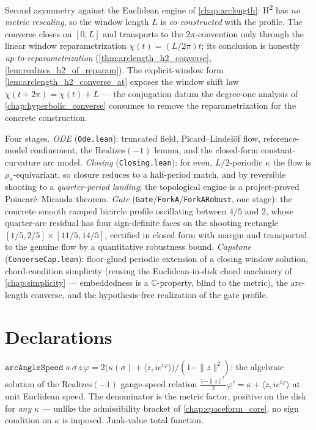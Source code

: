Second asymmetry against the Euclidean engine of \cref{chap:arclength}:
H\textsuperscript{2} has \emph{no metric rescaling}, so the window length $L$
is \emph{co-constructed} with the profile. The converse closes on $[0,L]$ and
transports to the $2\pi$-convention only through the linear window
reparametrization $\chi(t)=(L/2\pi)t$; its conclusion is honestly
\emph{up-to-reparametrization} (\cref{thm:arclength_h2_converse},
\cref{lem:realizes_h2_of_reparam}). The explicit-window form
\cref{lem:arclength_h2_converse_at} exposes the window shift law
$\chi(t+2\pi)=\chi(t)+L$ — the conjugation datum the degree-one analysis of
\cref{chap:hyperbolic_converse} consumes to remove the reparametrization for
the concrete construction.

Four stages. \emph{ODE} (\texttt{Ode.lean}): truncated field, Picard--Lindelöf
flow, reference-model confinement, the $\mathrm{Realizes}(-1)$ lemma, and the
closed-form constant-curvature arc model. \emph{Closing}
(\texttt{Closing.lean}): for even, $L/2$-periodic $\kappa$ the flow is
$\rho_\pi$-equivariant, so closure reduces to a half-period match, and by
reversible shooting to a \emph{quarter-period landing}; the topological engine
is a project-proved Poincaré--Miranda theorem. \emph{Gate}
(\texttt{Gate}/\texttt{ForkA}/\texttt{ForkARobust}, one stage): the concrete
smooth ramped bicircle profile oscillating between $4/5$ and $2$, whose
quarter-arc residual has four sign-definite faces on the shooting rectangle
$[1/5,2/5]\times[11/5,14/5]$, certified in closed form with margin and
transported to the genuine flow by a quantitative robustness bound.
\emph{Capstone} (\texttt{ConverseCap.lean}): floor-glued periodic extension of
a closing window solution, chord-condition simplicity (reusing the
Euclidean-in-disk chord machinery of \cref{chap:simplicity} — embeddedness is a
$\mathbb C$-property, blind to the metric), the arc-length converse, and the
hypothesis-free realization of the gate profile.

\section{Declarations}

\begin{definition}
  \label{def:arc_angle_speed}
  $\texttt{arcAngleSpeed}\;\kappa\,\sigma\,z\,\varphi =
  2\bigl(\kappa(\sigma)+\langle z, i e^{i\varphi}\rangle\bigr)/(1-\|z\|^{2})$:
  the algebraic solution of the $\mathrm{Realizes}(-1)$ gauge-speed relation
  $\tfrac{1-\|z\|^2}{2}\varphi'=\kappa+\langle z,ie^{i\varphi}\rangle$ at unit
  Euclidean speed. The denominator is the metric factor, positive on the disk
  for \emph{any} $\kappa$ — unlike the admissibility bracket of
  \cref{chap:spaceform_core}, no sign condition on $\kappa$ is imposed.
  Junk-value total function.
\end{definition}

